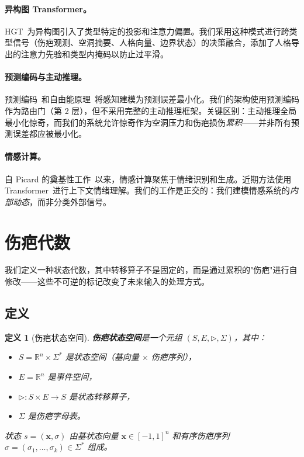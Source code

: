 \documentclass[11pt]{article}
\newtheorem{definition}[theorem]{定义}
\begin{document}
\paragraph{异构图 Transformer。}
HGT~\cite{hu2020}为异构图引入了类型特定的投影和注意力偏置。我们采用这种模式进行跨类型信号（伤疤观测、空洞摘要、人格向量、边界状态）的决策融合，添加了人格导出的注意力先验和类型内掩码以防止过平滑。

\paragraph{预测编码与主动推理。}
预测编码~\cite{rao1999}和自由能原理~\cite{friston2010}将感知建模为预测误差最小化。我们的架构使用预测编码作为路由门（第 2 层），但不采用完整的主动推理框架。关键区别：主动推理全局最小化惊奇，而我们的系统允许惊奇作为空洞压力和伤疤损伤\emph{累积}——并非所有预测误差都应被最小化。

\paragraph{情感计算。}
自 Picard 的奠基性工作~\cite{picard1997}以来，情感计算聚焦于情绪识别和生成。近期方法使用 Transformer~\cite{vaswani2017}进行上下文情绪理解。我们的工作是正交的：我们建模情感系统的\emph{内部动态}，而非分类外部信号。

\section{伤疤代数}
\label{sec:scar}

我们定义一种状态代数，其中转移算子不是固定的，而是通过累积的"伤疤"进行自修改——这些不可逆的标记改变了未来输入的处理方式。

\subsection{定义}

\begin{definition}[伤疤状态空间]
\label{def:scar-space}
\textbf{伤疤状态空间}是一个元组 $(S, E, \triangleright, \Sigma)$，其中：
\begin{itemize}
\item $S = \mathbb{R}^n \times \Sigma^*$ 是状态空间（基向量 $\times$ 伤疤序列），
\item $E = \mathbb{R}^n$ 是事件空间，
\item $\triangleright: S \times E \to S$ 是状态转移算子，
\item $\Sigma$ 是伤疤字母表。
\end{itemize}
状态 $s = (\mathbf{x}, \sigma)$ 由基状态向量 $\mathbf{x} \in [-1,1]^n$ 和有序伤疤序列 $\sigma = (\sigma_1, \ldots, \sigma_k) \in \Sigma^*$ 组成。
\end{definition}
\end{document}
